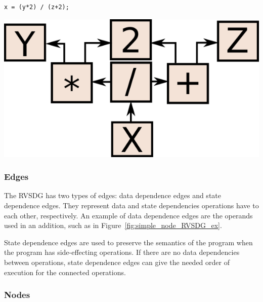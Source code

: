 \begin{centering}
	\noindent\begin{minipage}{0.36\textwidth}
		\begin{CenteredBox}
		\begin{lstlisting}[label={lst:simple_node_RVSDG_ex},
style=minipage_customcpp, basicstyle=\fontsize{10}{1}]
x = (y*2) / (z+2);
		\end{lstlisting}
		\end{CenteredBox}
	\end{minipage}
	\noindent\begin{minipage}{0.55\textwidth}
		\captionsetup{type=figure}
		\includegraphics[width=\textwidth]{figures/simple_node_RVSDG_ex}
	\end{minipage}
	\label{fig:simple_node_RVSDG_ex}
\end{centering}

\subsubsection{Edges}

The RVSDG has two types of edges: data dependence edges and state dependence
edges. They represent data and state dependencies operations have to each other,
respectively. An example of data dependence edges are the operands used in an
addition, such as in Figure~\ref{fig:simple_node_RVSDG_ex}.

State dependence edges are used to preserve the semantics of the program when
the program has side-effecting operations. If there are no data dependencies
between operations, state dependence edges can give the needed order of
execution for the connected operations.

\subsubsection{Nodes}

